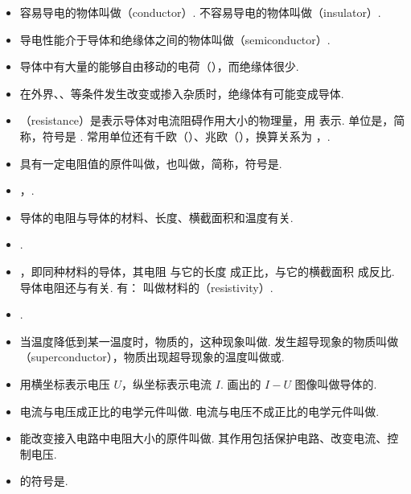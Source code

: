\begin{itemize}
\item 容易导电的物体叫做（conductor）. 不容易导电的物体叫做（insulator）.
\item 导电性能介于导体和绝缘体之间的物体叫做（semiconductor）.
\item 导体中有大量的能够自由移动的电荷（），而绝缘体很少.
\item 在外界、、等条件发生改变或掺入杂质时，绝缘体有可能变成导体.
\item {}（resistance）是表示导体对电流阻碍作用大小的物理量，用  表示. 单位是，简称，符号是 \blue{$\bm\Omega$}. 常用单位还有千欧（）、兆欧（），换算关系为 ，.
\item 具有一定电阻值的原件叫做，也叫做，简称，符号是\resistance. 
\item {}，.
\item 导体的电阻与导体的材料、长度、横截面积和温度有关.
\item {}.
\item {}，即同种材料的导体，其电阻  与它的长度  成正比，与它的横截面积  成反比. 导体电阻还与有关. 有：
\newline \blue{$\bm\rho$} 叫做材料的（resistivity）.
\item {}.
\item 当温度降低到某一温度时，物质的，这种现象叫做. 发生超导现象的物质叫做（superconductor），物质出现超导现象的温度叫做或.
\item 用横坐标表示电压 $U$，纵坐标表示电流 $I$. 画出的 $I-U$ 图像叫做导体的.
\item 电流与电压成正比的电学元件叫做. 电流与电压不成正比的电学元件叫做.
\item 能改变接入电路中电阻大小的原件叫做. 其作用包括保护电路、改变电流、控制电压.
\item {}的符号是\slidingrheostat.
\end{itemize}